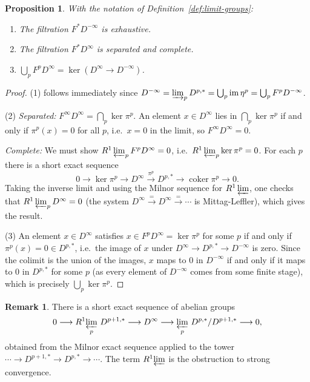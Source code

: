 \documentclass[12pt,a4paper]{article}
\newtheorem{proposition}[theorem]{Proposition}
\theoremstyle{definition}
\newtheorem{remark}[theorem]{Remark}
\begin{document}
\begin{proposition}\label{prop:filtration-properties}
With the notation of Definition~\ref{def:limit-groups}:
\begin{enumerate}
  \item The filtration $F^*D^{-\infty}$ is exhaustive.
  \item The filtration $F^*D^\infty$ is separated and complete.
  \item $\bigcup_p F^p D^\infty = \ker(D^\infty\to D^{-\infty})$.
\end{enumerate}
\end{proposition}
\begin{proof}
(1) follows immediately since $D^{-\infty}=\varinjlim_p D^{p,*}=\bigcup_p\operatorname{im}\eta^p
= \bigcup_p F^pD^{-\infty}$.

(2) \textit{Separated:} $F^\infty D^\infty = \bigcap_p\ker\pi^p$.  An element
$x\in D^\infty$ lies in $\bigcap_p\ker\pi^p$ if and only if $\pi^p(x)=0$ for all
$p$, i.e.\ $x=0$ in the limit, so $F^\infty D^\infty=0$.

\textit{Complete:} We must show $R^1\varprojlim_p F^pD^\infty=0$, i.e.\
$R^1\varprojlim_p\ker\pi^p=0$.  For each $p$ there is a short exact sequence
\[
  0\longrightarrow \ker\pi^p \longrightarrow D^\infty
  \xrightarrow{\pi^p} D^{p,*} \longrightarrow \operatorname{coker}\pi^p\longrightarrow 0.
\]
Taking the inverse limit and using the Milnor sequence for $R^1\varprojlim$, one
checks that $R^1\varprojlim_p D^\infty=0$ (the system $D^\infty\xrightarrow{=}D^\infty
\xrightarrow{=}\cdots$ is Mittag-Leffler), which gives the result.

(3) An element $x\in D^\infty$ satisfies $x\in F^pD^\infty=\ker\pi^p$ for some $p$
if and only if $\pi^p(x)=0\in D^{p,*}$, i.e.\ the image of $x$ under
$D^\infty\to D^{p,*}\to D^{-\infty}$ is zero.  Since the colimit is the union of
the images, $x$ maps to $0$ in $D^{-\infty}$ if and only if it maps to $0$ in
$D^{p,*}$ for some $p$ (as every element of $D^{-\infty}$ comes from some finite
stage), which is precisely $\bigcup_p\ker\pi^p$.
\end{proof}

\begin{remark}\label{rem:RlimD}
There is a short exact sequence of abelian groups
\[
  0\longrightarrow R^1\!\varprojlim_p\, D^{p+1,*}
  \longrightarrow D^\infty
  \longrightarrow \varprojlim_p\, D^{p,*}/D^{p+1,*}
  \longrightarrow 0,
\]
obtained from the Milnor exact sequence applied to the tower $\cdots\to D^{p+1,*}
\to D^{p,*}\to\cdots$.  The term $R^1\!\varprojlim$ is the obstruction to strong
convergence.
\end{remark}
\end{document}
